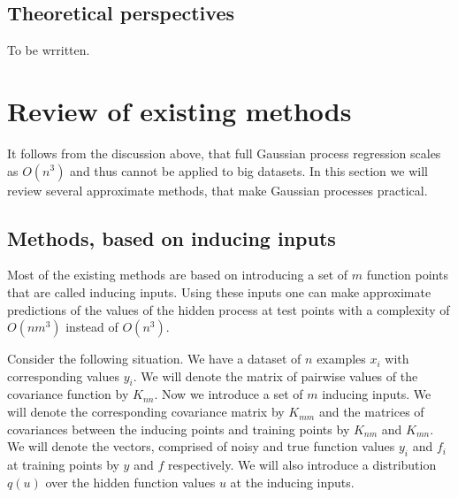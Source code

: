 \documentclass[12pt]{article}
\begin{document}
\subsection{Theoretical perspectives}
	\hspace{0.6cm}To be wrritten.

\pagebreak
\section{Review of existing methods}

\hspace{0.6cm}It follows from the discussion above, that full Gaussian process regression scales as $O(n^3)$ and thus cannot be applied to big datasets. In this section we will review several approximate methods, that make Gaussian processes practical.

\subsection{Methods, based on inducing inputs}
	\hspace{0.6cm}Most of the existing methods are based on introducing a set of $m$ function points that are called inducing inputs. Using these inputs one can make approximate predictions of the values of the hidden process at test points with a complexity of $O(nm^3)$ instead of $O(n^3)$.
	
	Consider the following situation. We have a dataset of $n$ examples $x_i$ with corresponding values $y_i$. We will denote the matrix of pairwise values of the covariance function by $K_{nn}$. Now we introduce a set of $m$ inducing inputs. We will denote the corresponding covariance matrix by $K_{mm}$ and the matrices of covariances between the inducing points and training points by $K_{nm}$ and $K_{mn}$. We will denote the vectors, comprised of noisy and true function values $y_i$ and $f_i$ at training points by $y$ and $f$ respectively. We will also introduce a distribution $q(u)$ over the hidden function values $u$ at the inducing inputs.
	
	
	
\end{document}
